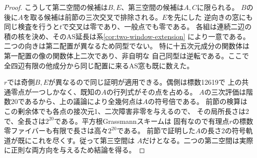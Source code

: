 \begin{proof}
こうして第二空間の候補は$B,E$、第三空間の候補は$A,C$に限られる。
$B$の後に$A$を取る候補は前節の三次交叉で排除される。$E$を先にした
逆向きの窓にも同じ検査を行うと$t$で交叉は零であり、一般点でも零である。
各組は連続二辺の積の核を決め、そのAS延長は系\ref{cor:two-window-extension}
により一意である。二つの向きは第二配置が異なるため同型でない。
特に十五次元成分の関数体は第一配置の像の関数体上二次であり、非自明な
自己同型は逆転である。ここで全四辺有限の他成分から同じ配置に来るAS窓も既に数えた。

$r$では奇側$B,E$が異なるので同じ証明が適用できる。偶側は標数12619で
上の共通零点が一つしかなく、既知の$A$の行列式がその点を占める。
$A$の三次評価は階数20であるから、上の議論により全幾何点は$A$の符号倍である。
前節の検算はこの剰余体でも各点の接次元1、二次障害非零を与えるので、
その局所長さは2で、全長さは$2^{20}$である。平方根Grassmannスキームは
固有なので有理点$r$の標数零ファイバーも有限で長さは高々$2^{20}$である。
前節で証明した$A$の長さ2の符号軌道が既にこれを尽くす。従って第三空間は
$A$だけとなる。二つの第二空間は実際に正則な両方向を与えるため結論を得る。
\end{proof}
